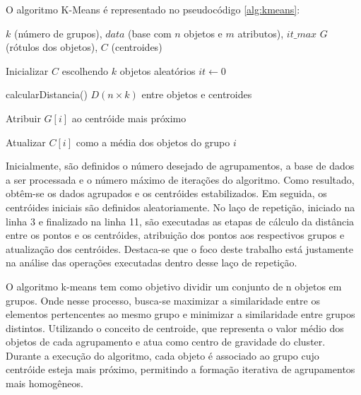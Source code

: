 \documentclass[10pt,a4paper,twocolumn]{article}
\begin{document}
O algoritmo K-Means é representado no pseudocódigo \ref{alg:kmeans}:


\begin{algorithm}[htbp]
\caption{Algoritmo do K-Means adaptado de \cite{Ferrari2016}.}
\label{alg:kmeans}
\begin{algorithmic}[1]

\Require $k$ (número de grupos), $data$ (base com $n$ objetos e $m$ atributos), $it\_max$
\Ensure $G$ (rótulos dos objetos), $C$ (centroides)

\State Inicializar $C$ escolhendo $k$ objetos aleatórios
\State $it \gets 0$


    \State calcularDistancia() $D(n \times k)$ entre objetos e centroides

        \State Atribuir $G[i]$ ao centróide mais próximo
    \EndFor

        \State Atualizar $C[i]$ como a média dos objetos do grupo $i$
    \EndFor


\EndWhile

\end{algorithmic}
\end{algorithm}


Inicialmente, são definidos o número desejado de agrupamentos, a base de dados a ser processada e o número máximo de iterações do algoritmo. Como resultado, obtêm-se os dados agrupados e os centróides estabilizados. Em seguida, os centróides iniciais são definidos aleatoriamente. No laço de repetição, iniciado na linha 3 e finalizado na linha 11, são executadas as etapas de cálculo da distância entre os pontos e os centróides, atribuição dos pontos aos respectivos grupos e atualização dos centróides. Destaca-se que o foco deste trabalho está justamente na análise das operações executadas dentro desse laço de repetição.

O algoritmo k-means tem como objetivo dividir um conjunto de n objetos em grupos. Onde nesse processo, busca-se maximizar a similaridade entre os elementos pertencentes ao mesmo grupo e minimizar a similaridade entre grupos distintos. Utilizando o conceito de centroide, que representa o valor médio dos objetos de cada agrupamento e atua como centro de gravidade do cluster. Durante a execução do algoritmo, cada objeto é associado ao grupo cujo centróide esteja mais próximo, permitindo a formação iterativa de agrupamentos mais homogêneos. \cite{Ferrari2016} 
\end{document}
